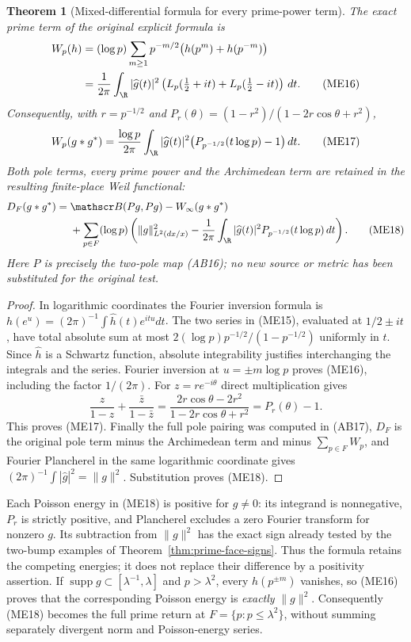 \documentclass[11pt,a4paper]{article}
\newtheorem{theorem}{Theorem}[section]
\theoremstyle{definition}\newtheorem{definition}[theorem]{Definition}
\newcommand{\supp}{\operatorname{supp}}\newcommand{\tr}{\operatorname{tr}}
\begin{document}
\begin{theorem}[Mixed-differential formula for every prime-power term]
\label{thm:ME-Weil-prime}
The exact prime term of the original explicit formula is
\begin{align}
 W_p(h)&=(\log p)\sum_{m\ge1}p^{-m/2}
       \bigl(h(p^m)+h(p^{-m})\bigr)\notag\\
 &=\frac1{2\pi}\int_\R |\widehat g(t)|^2
 \left(L_p(\tfrac12+it)+L_p(\tfrac12-it)\right)\,dt.
 \tag{ME16}\label{eq:ME-Weil-prime}
\end{align}
Consequently, with $r=p^{-1/2}$ and
$P_r(\theta)=(1-r^2)/(1-2r\cos\theta+r^2)$,
\[
 W_p(g*g^*)=\frac{\log p}{2\pi}\int_\R
 |\widehat g(t)|^2\bigl(P_{p^{-1/2}}(t\log p)-1\bigr)\,dt.
 \tag{ME17}\label{eq:ME-poisson}
\]
Both pole terms, every prime power and the Archimedean term are retained
in the resulting finite-place Weil functional:
\begin{align}
 D_F(g*g^*)={}&\mathscr B(Pg,Pg)-W_\infty(g*g^*)\notag\\
 &+\sum_{p\in F}(\log p)\left(
 \|g\|_{L^2(dx/x)}^2-
 \frac1{2\pi}\int_\R|\widehat g(t)|^2
 P_{p^{-1/2}}(t\log p)\,dt\right).
 \tag{ME18}\label{eq:ME-complete-prime-receiver}
\end{align}
Here $P$ is precisely the two-pole map (AB16); no new source or metric
has been substituted for the original test.
\end{theorem}
\begin{proof}
In logarithmic coordinates the Fourier inversion formula is
$h(e^u)=(2\pi)^{-1}\int\widehat h(t)e^{itu}dt$.
The two series in (ME15), evaluated at $1/2\pm it$, have total absolute
sum at most $2(\log p)p^{-1/2}/(1-p^{-1/2})$ uniformly in $t$.
Since $\widehat h$ is a Schwartz function, absolute integrability justifies
interchanging the integrals and the series. Fourier inversion at
$u=\pm m\log p$ proves (ME16), including the factor $1/(2\pi)$.
For $z=re^{-i\theta}$ direct multiplication gives
\[
 \frac{z}{1-z}+\frac{\bar z}{1-\bar z}
 =\frac{2r\cos\theta-2r^2}{1-2r\cos\theta+r^2}
 =P_r(\theta)-1.
 \tag{ME19}
\]
This proves (ME17). Finally the full pole pairing was computed in (AB17),
$D_F$ is the original pole term minus the Archimedean term and minus
$\sum_{p\in F}W_p$, and Fourier Plancherel in the same logarithmic
coordinate gives $(2\pi)^{-1}\int|\widehat g|^2=\|g\|^2$.
Substitution proves (ME18).
\end{proof}

Each Poisson energy in (ME18) is positive for $g\ne0$: its integrand is
nonnegative, $P_r$ is strictly positive, and Plancherel excludes a zero
Fourier transform for nonzero $g$. Its subtraction from $\|g\|^2$ has
the exact sign already tested by the two-bump examples of
Theorem~\ref{thm:prime-face-signs}. Thus the formula retains the
competing energies; it does not replace their difference by a positivity
assertion. If $\supp g\subset[\lambda^{-1},\lambda]$ and
$p>\lambda^2$, every $h(p^{\pm m})$ vanishes, so (ME16) proves that
the corresponding Poisson energy is \emph{exactly} $\|g\|^2$.
Consequently (ME18) becomes the full prime return at
$F=\{p:p\le\lambda^2\}$, without summing separately divergent
norm and Poisson-energy series.
\end{document}
